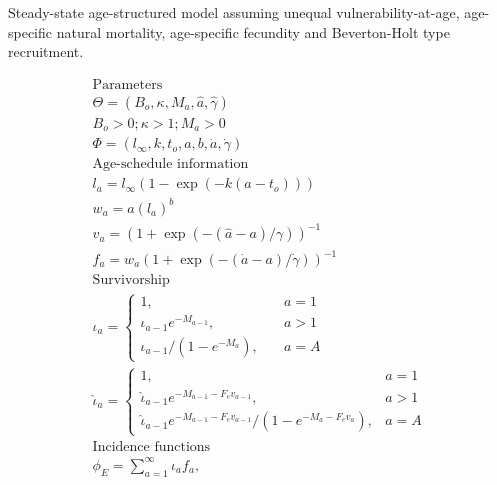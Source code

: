 \begin{multicols}{2}
\begin{tablehere}
\caption{Steady-state age-structured model assuming unequal
vulnerability-at-age, age-specific natural mortality, age-specific
fecundity and Beverton-Holt type recruitment.}\label{tab:equilibrium_model} 
\tableEq
    \begin{gather}
           \hline
        \mbox{Parameters} \nonumber \\
            \Theta = (B_o,\kappa,M_a,\hat{a},\hat{\gamma})      \label{T2.1}\\
            B_o>0; \kappa > 1; M_a > 0\\
            \Phi = (l_\infty, k, t_o,a,b,\dot{a},\dot{\gamma})  \label{T2.3}\\[1ex]
        \mbox{Age-schedule information} \nonumber\\
            l_a=l_\infty(1-\exp(-k(a-t_o)))                     \label{T2.4}\\
            w_a=a(l_a)^b                                        \label{T2.5}\\
            v_a=(1+\exp(-(\hat{a}-a)/\gamma))^{-1}              \label{T2.6}\\
            f_a=w_a(1+\exp(-(\dot{a}-a)/\dot{\gamma}))^{-1}     \label{T2.7}\\[1ex]
        \mbox{Survivorship} \nonumber\\
            \iota_a=\begin{cases} 1, &\quad a=1                 \label{T2.8}\\
            \iota_{a-1}e^{-M_{a-1}},&\quad a>1\\
            \iota_{a-1}/(1-e^{-M_a}),&\quad a=A \end{cases}\\
            \hat{\iota}_a=\begin{cases} 1, & a=1\\
            \hat{\iota}_{a-1}e^{-M_{a-1}-F_e v_{a-1}},& a>1\\
            \hat{\iota}_{a-1}e^{-M_{a-1}-F_e v_{a-1}}/(1-e^{-M_{a}-F_e v_{a}}),& a=A
            \end{cases}                                         \label{T2.9}\\[1ex]
        \mbox{Incidence functions} \nonumber \\
            \phi_E=\sum_{a=1}^\infty \iota_a f_a, \quad

\end{gather}
\end{tablehere}
\end{multicols}
